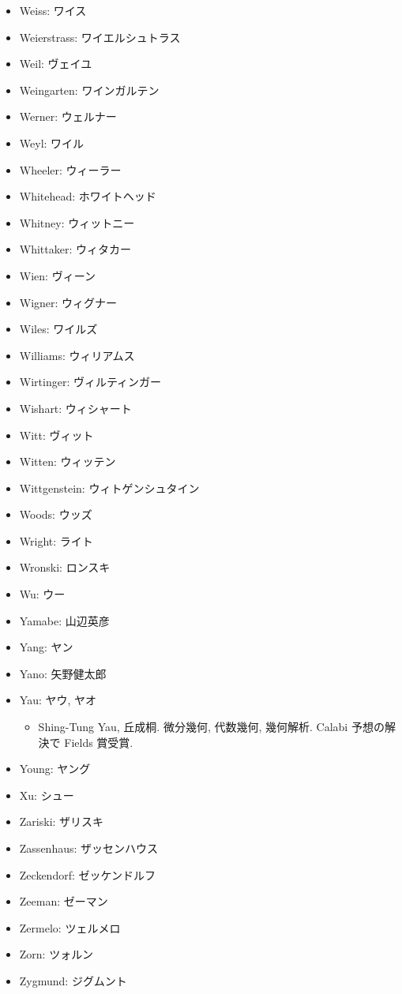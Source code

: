 \documentclass[openany, a4paper, oneside]{jsbook}
\begin{document}
\begin{itemize}
\item Weiss: ワイス
\item Weierstrass: ワイエルシュトラス
\item Weil: ヴェイユ
\item Weingarten: ワインガルテン
\item Werner: ウェルナー
\item Weyl: ワイル
\item Wheeler: ウィーラー
\item Whitehead: ホワイトヘッド
\item Whitney: ウィットニー
\item Whittaker: ウィタカー
\item Wien: ヴィーン
\item Wigner: ウィグナー
\item Wiles: ワイルズ
\item Williams: ウィリアムス
\item Wirtinger: ヴィルティンガー
\item Wishart: ウィシャート
\item Witt: ヴィット
\item Witten: ウィッテン
\item Wittgenstein: ウィトゲンシュタイン
\item Woods: ウッズ
\item Wright: ライト
\item Wronski: ロンスキ
\item Wu: ウー
\item Yamabe: 山辺英彦
\item Yang: ヤン
\item Yano: 矢野健太郎
\item Yau: ヤウ, ヤオ
\begin{itemize}
\item Shing-Tung Yau, 丘成桐. 微分幾何, 代数幾何, 幾何解析. Calabi 予想の解決で Fields 賞受賞.
\end{itemize}
\item Young: ヤング
\item Xu: シュー
\item Zariski: ザリスキ
\item Zassenhaus: ザッセンハウス
\item Zeckendorf: ゼッケンドルフ
\item Zeeman: ゼーマン
\item Zermelo: ツェルメロ
\item Zorn: ツォルン
\item Zygmund: ジグムント
\end{itemize}
\end{document}
